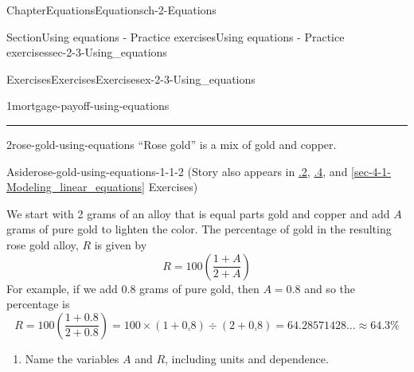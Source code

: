 \documentclass[twoside,11pt,]{book}
\newcommand{\xreffont}{\relax}
\newlength{\workspacestrutwidth}
\numberwithin{equation}{section}
\newcommand{\amp}{&}
\begin{document}
\begin{chapterptx}{Chapter}{Equations}{}{Equations}{}{}{ch-2-Equations}
\begin{sectionptx}{Section}{Using equations - Practice exercises}{}{Using equations - Practice exercises}{}{}{sec-2-3-Using_equations}
\begin{exercises-subsection-numberless}{Exercises}{Exercises}{}{Exercises}{}{}{ex-2-3-Using_equations}
\begin{divisionexercise}{1}{}{}{mortgage-payoff-using-equations}
\begin{enumerate}[label=(\alph*),ref=\alph*]
\par\rule{\workspacestrutwidth}{0.25in}%
\end{enumerate}%
\end{divisionexercise}%
\clearpage
\begin{divisionexercise}{2}{}{}{rose-gold-using-equations}%
``Rose gold'' is a mix of gold and copper. \begin{aside}{Aside}{}{rose-gold-using-equations-1-1-2}%
(Story also appears in \hyperlink{rose-gold-order-operations}{{\xreffont 0.4.2}}, \hyperlink{rose-gold-algebraic-notation}{{\xreffont 0.7.4}}, and \hyperref[sec-4-1-Modeling_linear_equations]{{\xreffont\ref{sec-4-1-Modeling_linear_equations}}} Exercises)%
\end{aside}
 We start with 2 grams of an alloy that is equal parts gold and copper and add \(A\) grams of pure gold to lighten the color. The percentage of gold in the resulting rose gold alloy, \(R\) is given by%
\begin{equation*}
R = 100\left(\frac{1+A}{2+A}\right)
\end{equation*}
For example, if we add 0.8 grams of pure gold, then \(A=0.8\) and so the percentage is%
\begin{equation*}
R = 100\left(\frac{1+0.8}{2+0.8}\right)
= 100 \times (1 + \underline{0.8})\div(2+\underline{0.8})
=64.28571428\ldots \approx 64.3\%
\end{equation*}
%
\begin{enumerate}[label=(\alph*),ref=\alph*]%
\item{}Name the variables \(A\) and \(R\), including units and dependence.%
\par
    \hspace{-2cm}
\end{enumerate}
\end{divisionexercise}
\end{exercises-subsection-numberless}
\end{sectionptx}
\end{chapterptx}
\end{document}
